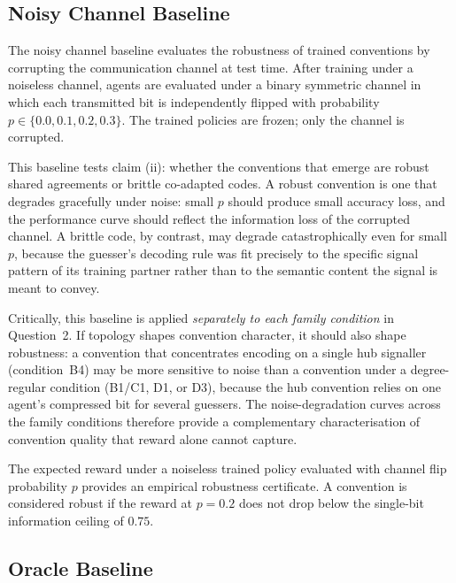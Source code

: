 \documentclass[a4paper,twoside,12pt]{report}
\begin{document}
    \subsection{Noisy Channel Baseline}
    \label{sec:baseline-noisy}
    
    The noisy channel baseline evaluates the robustness of trained
    conventions by corrupting the communication channel at test time. After
    training under a noiseless channel, agents are evaluated under a
    binary symmetric channel in which each transmitted bit is independently
    flipped with probability $p \in \{0.0, 0.1, 0.2, 0.3\}$. The trained
    policies are frozen; only the channel is corrupted.
    
    This baseline tests claim (ii): whether the conventions that emerge are
    robust shared agreements or brittle co-adapted codes. A robust convention
    is one that degrades gracefully under noise: small $p$ should produce
    small accuracy loss, and the performance curve should reflect the
    information loss of the corrupted channel. A brittle code, by contrast,
    may degrade catastrophically even for small $p$, because the guesser's
    decoding rule was fit precisely to the specific signal pattern of its
    training partner rather than to the semantic content the signal is meant
    to convey.
    
    Critically, this baseline is applied \emph{separately to each family
    condition} in Question~2. If topology shapes convention character, it
    should also shape robustness: a convention that concentrates encoding on a
    single hub signaller (condition~B4) may be more sensitive to noise than a
    convention under a degree-regular condition (B1/C1, D1, or D3), because the
    hub convention relies on one agent's compressed bit for several guessers.
    The noise-degradation curves across the family conditions therefore provide
    a complementary characterisation of convention quality that reward alone
    cannot capture.
    
    The expected reward under a noiseless trained policy evaluated with
    channel flip probability $p$ provides an empirical robustness certificate.
    A convention is considered robust if the reward at $p = 0.2$ does not drop
    below the single-bit information ceiling of $0.75$.
    
    \subsection{Oracle Baseline}
    \label{sec:baseline-oracle}
    
\end{document}
